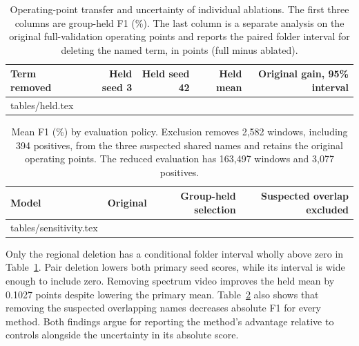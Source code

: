 \begin{table}[ht]
\caption{Operating-point transfer and uncertainty of individual ablations. The first three columns are group-held F1 (\%). The last column is a separate analysis on the original full-validation operating points and reports the paired folder interval for deleting the named term, in points (full minus ablated).}\label{tab:held}
\centering\small
\begin{tabular}{@{}lrrrr@{}}
\toprule Term removed & Held seed 3 & Held seed 42 & Held mean & Original gain, 95\% interval\\ \midrule
{} tables/held.tex
\bottomrule
\end{tabular}
\end{table}

\begin{table}[ht]
\caption{Mean F1 (\%) by evaluation policy. Exclusion removes 2,582 windows, including 394 positives, from the three suspected shared names and retains the original operating points. The reduced evaluation has 163,497 windows and 3,077 positives.}\label{tab:sensitivity}
\centering\small
\begin{tabular}{@{}lrrr@{}}
\toprule Model & Original & Group-held selection & Suspected overlap excluded\\ \midrule
{} tables/sensitivity.tex
\bottomrule
\end{tabular}
\end{table}

Only the regional deletion has a conditional folder interval wholly above zero in Table~\ref{tab:held}. Pair deletion lowers both primary seed scores, while its interval is wide enough to include zero. Removing spectrum video improves the held mean by 0.1027 points despite lowering the primary mean. Table~\ref{tab:sensitivity} also shows that removing the suspected overlapping names decreases absolute F1 for every method. Both findings argue for reporting the method's advantage relative to controls alongside the uncertainty in its absolute score.

